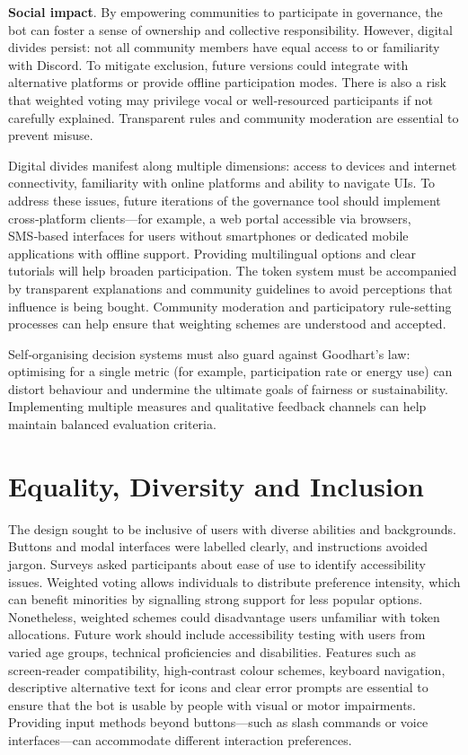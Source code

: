 \textbf{Social impact}.  By empowering communities to participate in
governance, the bot can foster a sense of ownership and collective
responsibility.  However, digital divides persist: not all community
members have equal access to or familiarity with Discord.  To mitigate
exclusion, future versions could integrate with alternative platforms or
provide offline participation modes.  There is also a risk that weighted
voting may privilege vocal or well‑resourced participants if not carefully
explained.  Transparent rules and community moderation are essential to
prevent misuse.

Digital divides manifest along multiple dimensions: access to devices and
internet connectivity, familiarity with online platforms and ability to
navigate UIs.  To address these issues, future iterations of
the governance tool should implement cross‑platform clients—for example,
a web portal accessible via browsers, SMS‑based interfaces for users
without smartphones or dedicated mobile applications with offline
support.  Providing multilingual options and clear tutorials will help
broaden participation.  The token system must be accompanied by
transparent explanations and community guidelines to avoid perceptions
that influence is being bought.  Community moderation and participatory
rule‑setting processes can help ensure that weighting schemes are
understood and accepted.

Self‑organising decision systems must also guard against Goodhart’s
law: optimising for a single metric (for example, participation rate
or energy use) can distort behaviour and undermine the ultimate goals of
fairness or sustainability.  Implementing multiple measures and
qualitative feedback channels can help maintain balanced evaluation
criteria.

\section{Equality, Diversity and Inclusion}

The design sought to be inclusive of users with diverse abilities and
backgrounds.  Buttons and modal interfaces were labelled clearly, and
instructions avoided jargon.  Surveys asked participants about ease of
use to identify accessibility issues.  Weighted voting allows
individuals to distribute preference intensity, which can benefit
minorities by signalling strong support for less popular options.
Nonetheless, weighted schemes could disadvantage users unfamiliar with
token allocations.  Future work should include accessibility testing
with users from varied age groups, technical proficiencies and
disabilities.  Features such as screen‑reader compatibility, high‑contrast
colour schemes, keyboard navigation, descriptive alternative text for
icons and clear error prompts are essential to ensure that the bot is
usable by people with visual or motor impairments.  Providing input
methods beyond buttons—such as slash commands or voice interfaces—can
accommodate different interaction preferences.

